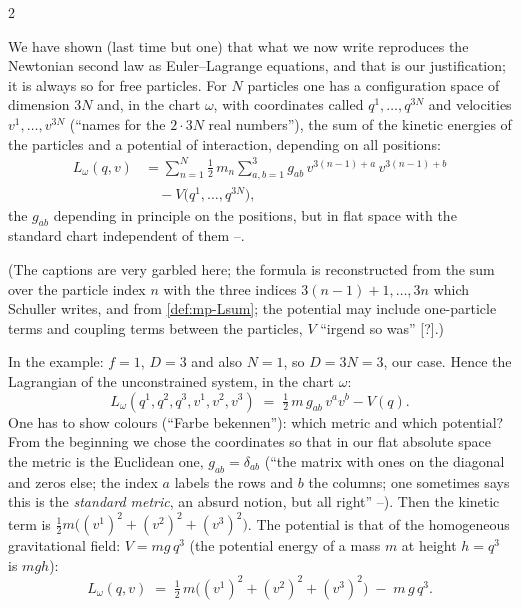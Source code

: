 \begin{paracol}{2}
\begin{recall}\label{rec:pc-step3}
We have shown (last time but one) that what we now write reproduces the Newtonian second law as Euler--Lagrange equations, and that is our justification; it is always so for free particles. For $N$ particles one has a configuration space of dimension $3N$ and, in the chart $\omega$, with coordinates called $q^1,\dots,q^{3N}$ and velocities $v^1,\dots,v^{3N}$ (``names for the $2\cdot3N$ real numbers''), the sum of the kinetic energies of the particles and a potential of interaction, depending on all positions:
\[
  \begin{aligned}L_\omega(q,v)&=\sum_{n=1}^{N}\tfrac12\,m_n\sum_{a,b=1}^{3}g_{ab}\,v^{3(n-1)+a}\,v^{3(n-1)+b}\\&\quad-V\bigl(q^1,\dots,q^{3N}\bigr),\end{aligned}
\]
the $g_{ab}$ depending in principle on the positions, but in flat space with the standard chart independent of them --.
\end{recall}
(The captions are very garbled here; the formula is reconstructed from the sum over the particle index $n$ with the three indices $3(n-1)+1,\dots,3n$ which Schuller writes, and from \cref{def:mp-Lsum}; the potential may include one-particle terms and coupling terms between the particles, $V$ ``irgend so was'' [?].)

In the example: $f=1$, $D=3$ and also $N=1$, so $D=3N=3$, our case. Hence the Lagrangian of the unconstrained system, in the chart $\omega$:
\[
  L_\omega(q^1,q^2,q^3,v^1,v^2,v^3)\;=\;\tfrac12\,m\,g_{ab}\,v^av^b-V(q).
\]
One has to show colours (``Farbe bekennen''): which metric and which potential? From the beginning we chose the coordinates so that in our flat absolute space the metric is the Euclidean one, $g_{ab}=\delta_{ab}$ (``the matrix with ones on the diagonal and zeros else; the index $a$ labels the rows and $b$ the columns; one sometimes says this is the \emph{standard metric}, an absurd notion, but all right'' --). Then the kinetic term is $\tfrac12m\bigl((v^1)^2+(v^2)^2+(v^3)^2\bigr)$. The potential is that of the homogeneous gravitational field: $V=mg\,q^3$ (the potential energy of a mass $m$ at height $h=q^3$ is $mgh$):
\begin{equation}\label{eq:pc-Lfree}
  L_\omega(q,v)\;=\;\tfrac12\,m\bigl((v^1)^2+(v^2)^2+(v^3)^2\bigr)\;-\;m\,g\,q^3 .
\end{equation}


\end{paracol}
